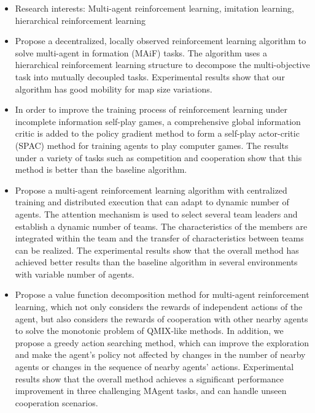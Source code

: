 
{\small
  \begin{itemize}
    \item Research interests: Multi-agent reinforcement learning, imitation learning, hierarchical reinforcement learning
    \item Propose a decentralized, locally observed reinforcement learning algorithm to solve multi-agent in formation (MAiF) tasks. The algorithm uses a hierarchical reinforcement learning structure to decompose the multi-objective task into mutually decoupled tasks. Experimental results show that our algorithm has good mobility for map size variations.
    \item In order to improve the training process of reinforcement learning under incomplete information self-play games, a comprehensive global information critic is added to the policy gradient method to form a self-play actor-critic (SPAC) method for training agents to play computer games. The results under a variety of tasks such as competition and cooperation show that this method is better than the baseline algorithm.
    \item Propose a multi-agent reinforcement learning algorithm with centralized training and distributed execution that can adapt to dynamic number of agents. The attention mechanism is used to select several team leaders and establish a dynamic number of teams. The characteristics of the members are integrated within the team and the transfer of characteristics between teams can be realized. The experimental results show that the overall method has achieved better results than the baseline algorithm in several environments with variable number of agents.
    \item Propose a value function decomposition method for multi-agent reinforcement learning, which not only considers the rewards of independent actions of the agent, but also considers the rewards of cooperation with other nearby agents to solve the monotonic problem of QMIX-like methods. In addition, we propose a greedy action searching method, which can improve the exploration and make the agent's policy not affected by changes in the number of nearby agents or changes in the sequence of nearby agents' actions. Experimental results show that the overall method achieves a significant performance improvement in three challenging MAgent tasks, and can handle unseen cooperation scenarios.

\end{itemize}}
